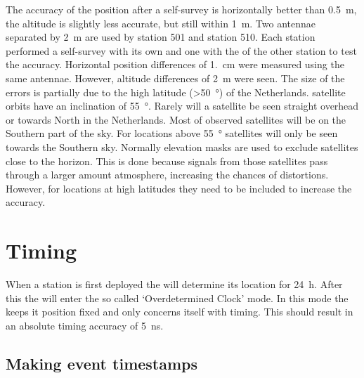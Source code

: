 The accuracy of the position after a self-survey is horizontally better than \SI{0.5}{\meter}, the altitude is slightly less accurate, but still within \SI{1}{\meter}. Two \gps antennae separated by \SI{2}{\meter} are used by station 501 and station 510. Each station performed a self-survey with its own \gps and one with the \gps of the other station to test the accuracy. Horizontal position differences of \SI{1.}{\centi\meter} were measured using the same \gps antennae. However, altitude differences of \SI{2}{\meter} were seen. The size of the errors is partially due to the high latitude (\SI{>50}{\degree}) of the Netherlands. \gps satellite orbits have an inclination of \SI{55}{\degree}. Rarely will a satellite be seen straight overhead or towards North in the Netherlands. Most of observed satellites will be on the Southern part of the sky. For locations above \SI{55}{\degree} satellites will only be seen towards the Southern sky. Normally elevation masks are used to exclude \gps satellites close to the horizon. This is done because signals from those satellites pass through a larger amount atmosphere, increasing the chances of distortions. However, for locations at high latitudes they need to be included to increase the accuracy.

%


\section{Timing}

When a \hisparc station is first deployed the \gps will determine its location for \SI{24}{\hour}. After this the \gps will enter the so called `Overdetermined Clock' mode. In this mode the \gps keeps it position fixed and only concerns itself with timing. This should result in an absolute timing accuracy of \SI{5}{\ns}.


\subsection{Making event timestamps}
\label{sub:gps_timestamps}


